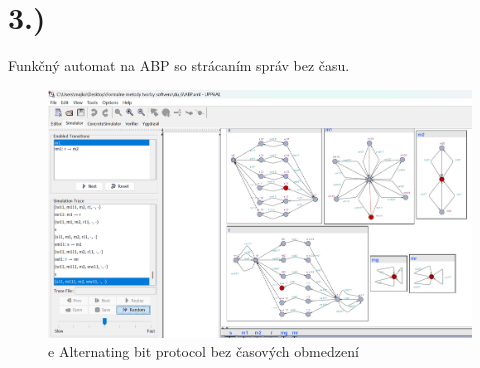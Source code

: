 \documentclass[a4paper]{article}
\begin{document}
\section{3.)}

Funkčný automat na ABP so strácaním správ bez času.

\begin{figure}[!h]
	\centering
	\includegraphics[width=1.1\textwidth]{ABP.png}
	\caption{e Alternating bit protocol bez časových
		obmedzení}
\end{figure}
\end{document}

